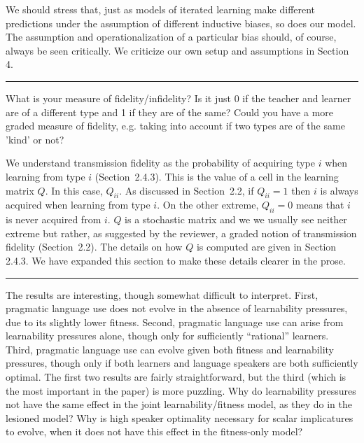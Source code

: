 \documentclass[12pt,a4paper]{article}
\begin{document}
We should stress that, just as models of iterated learning make different predictions under the assumption of different inductive biases, so does our model. The assumption and operationalization of a particular bias should, of course, always be seen critically. We criticize our own setup and assumptions in Section 4. 


\vspace{0.5cm}
\noindent\rule{\textwidth}{1pt}

\begin{mdframed}[backgroundcolor=gray!25,linecolor=gray!25,frametitle= Reviewer \thereviewerCounter~comment \thereviewerCommentCounter \hfill ~~({\it transmission fidelity})]
%
What is your measure of fidelity/infidelity? Is it just 0 if the teacher and learner are of a different type and 1 if they are of the same? Could you have a more graded measure of fidelity, e.g. taking into account if two types are of the same 'kind' or not? 
\end{mdframed}
%
We understand transmission fidelity as the probability of acquiring type $i$ when learning from type $i$ (Section~2.4.3). This is the value of a cell in the learning matrix $Q$. In this case, $Q_{ii}$. As discussed in Section~2.2, if $Q_{ii} = 1$ then $i$ is always acquired when learning from type $i$. On the other extreme, $Q_{ii} = 0$ means that $i$ is never acquired from $i$. $Q$ is a stochastic matrix and we we usually see neither extreme but rather, as suggested by the reviewer, a graded notion of transmission fidelity (Section~2.2). The details on how $Q$ is computed are given in Section 2.4.3. We have expanded this section to make these details clearer in the prose.
%

\vspace{0.5cm}




\noindent\rule{\textwidth}{1pt}

\begin{mdframed}[backgroundcolor=gray!25,linecolor=gray!25,frametitle= Reviewer \thereviewerCounter~comment \thereviewerCommentCounter \hfill ~~({\it Interpretation of results})]
%
The results are interesting, though somewhat difficult to interpret. First, pragmatic language use does not evolve in the absence of learnability pressures, due to its slightly lower fitness. Second, pragmatic language use can arise from learnability pressures alone, though only for sufficiently ``rational'' learners. Third, pragmatic language use can evolve given both fitness and learnability pressures, though only if both learners and language speakers are both sufficiently optimal. The first two results are fairly straightforward, but the third (which is the most important in the paper) is more puzzling. Why do learnability pressures not have the same effect in the joint learnability/fitness model, as they do in the lesioned model? Why is high speaker optimality necessary for scalar implicatures to evolve, when it does not have this effect in the fitness-only model?
\end{mdframed}
\end{document}
